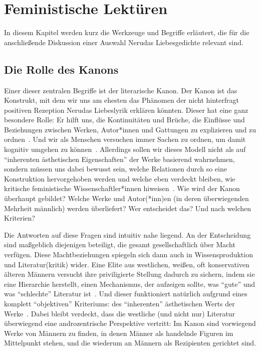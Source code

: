 \section{Feministische Lektüren}

In diesem Kapitel werden kurz die Werkzeuge und Begriffe erläutert, die für die anschließende Diskussion einer Auswahl Nerudas Liebesgedichte relevant sind.

\subsection{Die Rolle des Kanons}
\label{chap:canon}

Einer dieser zentralen Begriffe ist der literarische Kanon.
Der Kanon ist das Konstrukt, mit dem wir uns am ehesten das Phänomen der nicht hinterfragt positiven Rezeption Nerudas Liebeslyrik erklären könnten.
Dieser hat eine ganz besondere Rolle:
Er hilft uns, die Kontinuitäten und Brüche, die Einflüsse und Beziehungen zwischen Werken, Autor*innen und Gattungen zu explizieren und zu ordnen~\cite{Kolodny1980}.
Und wir als Menschen versuchen immer Sachen zu ordnen, um damit kognitiv umgehen zu können~\cite{JorRus1999}.
Allerdings sollen wir dieses Modell nicht als auf ``inherenten ästhetischen Eigenschaften'' der Werke basierend wahrnehmen, sondern müssen uns dabei bewusst sein, welche Relationen durch so eine Konstruktion hervorgehoben werden und welche eben verdeckt bleiben, wie kritische feministische Wissenschaftler*innen hiweisen~\cite{Kolodny1980}.
Wie wird der Kanon überhaupt gebildet?
Welche Werke und Autor(*inn)en (in deren überwiegenden Mehrheit männlich) werden überliefert?
Wer entscheidet das?
Und nach welchen Kriterien?

Die Antworten auf diese Fragen sind intuitiv nahe liegend.
An der Entscheidung sind maßgeblich diejenigen beteiligt, die gesamt gesellschaftlich über Macht verfügen.
Diese Machtbeziehungen spiegeln sich dann auch in Wissensproduktion und Literatur(kritik) wider.
Eine Elite aus westlichen, weißen, oft konservativen älteren Männern versucht ihre priviligierte Stellung dadurch zu sichern, indem sie eine Hierarchie herstellt, einen Mechanismus, der aufzeigen sollte, was ``gute'' und was ``schlechte'' Literatur ist~\cite{North2013}.
Und dieser funktioniert natürlich aufgrund eines komplett ``objektiven'' Kriteriums: des ``inherenten'' ästhetischen Werts der Werke~\cite{Kolodny1980}.
Dabei bleibt verdeckt, dass die westliche (und nicht nur) Literatur überwiegend eine androzentrische Perspektive vertritt:
Im Kanon sind vorwiegend Werke von Männern zu finden, in denen Männer als handelnde Figuren im Mittelpunkt stehen, und die wiederum an Männern als Rezipienten gerichtet sind.

